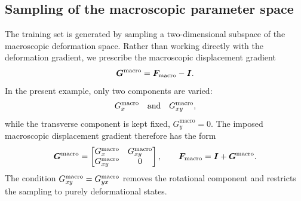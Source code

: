 \documentclass[11pt,a4paper]{article}
\newcommand{\PROMPT}[1]{ }
\begin{document}
\PROMPT{Now let us describe how to explore the parameteric space. We choose a structured grid of sampling points of $F_x^{macro}$ and $F_{xy}^{macro}$, that is, we have to specify the ``corners'' of the parametric space (please, put this more elegantly).  So, from the training point of view, we have to determine finite element states by solving the equilibrium of the unit cell for varying values of these two parameters (with $F_y = 1$). Actually, now that I think, it is better to use the gradient of displacements.  Let us elaborate this a little bit further by inspecting how it is done in the code (everything related to the code should be put into a \\MATLAB{} note, because I will hide it when writing the paper. Be that as it may, in the case that we are going to show later, the running script is /home/joaquin/Desktop/CURRENT_TASKS/MATLAB_CODES/TESTING_PROBLEMS_FEHROM/115_PAPER_MAW_ECM/01_METATcellHOM_2var/Run_HOMOG_2p.m.   The input data file is /home/joaquin/Desktop/CURRENT_TASKS/MATLAB_CODES/TESTING_PROBLEMS_FEHROM/115_PAPER_MAW_ECM/01_METATcellHOM_2var/DATAINPUTS/Data_M3.m, and then, inside:  /home/joaquin/Desktop/CURRENT_TASKS/MATLAB_CODES/TESTING_PROBLEMS_FEHROM/115_PAPER_MAW_ECM/01_METATcellHOM_2var/BC2v_M.m    ....There, there are two parameters DATAOUT.INPp.ParameterDomain_F_11 = [-0.42,0.42], DATAOUT.INPp.ParameterDomain_F_12 = [-0.05,0.05];DATAOUT.INPp.nsteps_F11 = 230;
DATAOUT.INPp.nsteps_F_12 = 20 ;  and /home/joaquin/Desktop/CURRENT_TASKS/MATLAB_CODES/TESTING_PROBLEMS_FEHROM/115_PAPER_MAW_ECM/01_METATcellHOM_2var/DetermineTrajectories_cg.m   and /home/joaquin/Desktop/CURRENT_TASKS/MATLAB_CODES/TESTING_PROBLEMS_FEHROM/115_PAPER_MAW_ECM/01_METATcellHOM_2var/buildGridTrajAndLabels.m. REad this and wait for my instructions

 )}

\subsection{Sampling of the macroscopic parameter space}

The training set is generated by sampling a two-dimensional subspace of the
macroscopic deformation space. Rather than working directly with the deformation
gradient, we prescribe the macroscopic displacement gradient
\[
\bm{G}^{\mathrm{macro}} = \bm{F}_{\mathrm{macro}} - \bm{I}.
\]
In the present example, only two components are varied:
\[
{G}^{\mathrm{macro}}_x
\quad \text{and} \quad
{G}^{\mathrm{macro}}_{xy},
\]
while the transverse component is kept fixed, \(G^{\mathrm{macro}}_y=0\). The
imposed macroscopic displacement gradient therefore has the form
\[
\bm{G}^{\mathrm{macro}}
=
\begin{bmatrix}
{G}^{\mathrm{macro}}_x & {G}^{\mathrm{macro}}_{xy} \\
{G}^{\mathrm{macro}}_{xy} & 0
\end{bmatrix},
\qquad
\bm{F}_{\mathrm{macro}} = \bm{I}+\bm{G}^{\mathrm{macro}} .
\]
The condition \({G}^{\mathrm{macro}}_{xy}=G^{\mathrm{macro}}_{yx}\) removes the
rotational component and restricts the sampling to purely deformational states.
\end{document}
